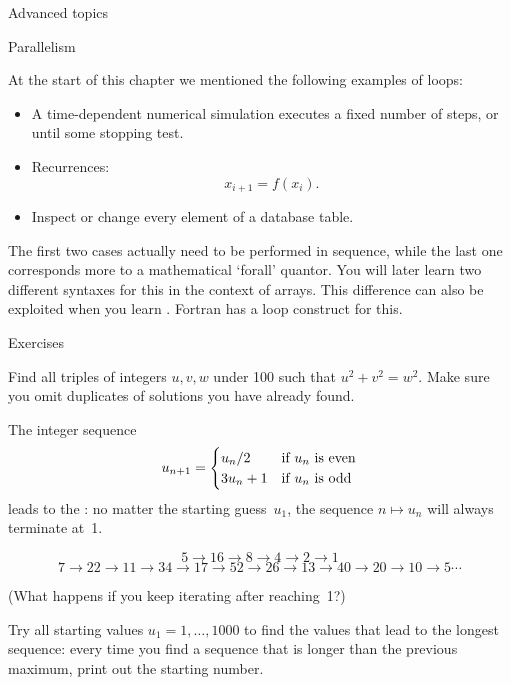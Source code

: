  {Advanced topics}

 {Parallelism}

At the start of this chapter we mentioned the following examples of loops:
\begin{itemize}
\item A time-dependent numerical simulation executes a fixed number of
  steps, or until some stopping test.
\item Recurrences: \[ x_{i+1} = f(x_i). \]
\item Inspect or change every element of a database table.
\end{itemize}
The first two cases actually need to be performed in sequence, while
the last one corresponds more to a mathematical `forall' quantor. You
will later learn two different syntaxes for this in the context of arrays.
This
difference can also be exploited when you learn
. Fortran has a
 loop construct for this.

 {Exercises}

\begin{exercise}
  \label{ex:pythagoras}
  Find all triples of integers $u,v,w$ under 100 such that
  $u^2+v^2=w^2$. Make sure you omit duplicates of solutions you have
  already found.
\end{exercise}

\begin{exercise}
  \label{ex:collatz}
  The integer sequence
  \[ u_{n+1} = 
  \begin{cases}
    u_n/2&\hbox{if $u_n$ is even}\\
    3u_n+1&\hbox{if $u_n$ is odd}\\
  \end{cases}
  \]
  leads to the : no matter the starting guess~$u_1$,
  the sequence $n\mapsto u_n$ will always terminate at~1.

  { \small
  \[ 5\rightarrow 16\rightarrow 8\rightarrow 4\rightarrow 2\rightarrow 1\]
  \[ 7\rightarrow 22\rightarrow 11\rightarrow 34\rightarrow
  17\rightarrow 52\rightarrow 26\rightarrow 13\rightarrow
  40\rightarrow 20\rightarrow 10\rightarrow 5\cdots \]
  }

  (What happens if you keep iterating after reaching~1?)
  
  Try all starting values $u_1=1,\ldots,1000$ to find the values that
  lead to the longest sequence: every time you find a sequence that is
  longer than the previous maximum, print out the starting number.
\end{exercise}

